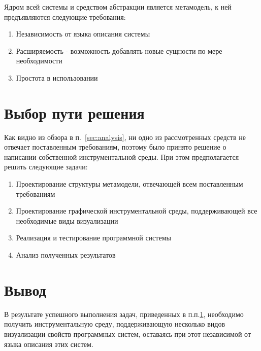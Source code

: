 Ядром всей системы и средством абстракции является метамодель, к ней
предъявляются следующие требования:

\begin{enumerate}
    \item Независимость от языка описания системы
    \item Расширяемость - возможность добавлять новые сущности по мере
    необходимости
    \item Простота в использовании
\end{enumerate}

\section{Выбор пути решения}
\label{sec:tasks}
Как видно из обзора в п.~\ref{sec:analysis}, ни одно из рассмотренных средств не
отвечает поставленным требованиям, поэтому было принято решение о написании
собственной инструментальной среды. При этом предполагается решить следующие
задачи:

\begin{enumerate}
    \item Проектирование структуры метамодели, отвечающей всем поставленным
    требованиям
    \item Проектирование графической инструментальной среды, поддерживающей все
    необходимые виды визуализации
    \item Реализация и тестирование программной системы
    \item Анализ полученных результатов
\end{enumerate}

\section{Вывод}
В результате успешного выполнения задач, приведенных в п.п.\ref{sec:tasks},
необходимо получить инструментальную среду, поддерживающую несколько видов
визуализации свойств программных систем, оставаясь при этот независимой от
языка описания этих систем.

